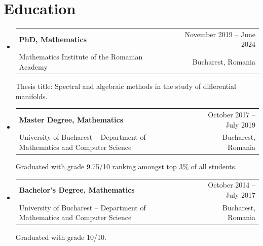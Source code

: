 \documentclass[a4paper, 11pt]{article}
\makeatletter
\newcommand{\CVSubheading}[4]{
  \vspace{-2pt}\item
    \begin{tabular*}{0.97\textwidth}[t]{l@{\extracolsep{\fill}}r}
      \textbf{#1} & #2 \\
      #3 & \ #4 \\
    \end{tabular*}\vspace{-7pt}
}
\newcommand{\CVSubHeadingListStart}{\begin{itemize}[leftmargin=0.5cm, label={}]}
\newcommand{\CVSubHeadingListEnd}{\end{itemize}}
\makeatother
\begin{document}
\section{Education}
  \CVSubHeadingListStart
    \CVSubheading
      {PhD, Mathematics}{November 2019 -- June 2024}
      {Mathematics Institute of the Romanian Academy}{Bucharest, Romania}

Thesis title: Spectral and algebraic methods in the study of differential manifolds.\\
    \CVSubheading
      {Master Degree, Mathematics}{October 2017 -- July 2019}
      {University of Bucharest -- Department of Mathematics and Computer Science}{Bucharest, Romania}
      
Graduated with grade 9.75/10 ranking amongst top 3\% of all students.
    \CVSubheading
      {Bachelor's Degree, Mathematics}{October 2014 -- July 2017}
      {University of Bucharest -- Department of Mathematics and Computer Science}{Bucharest, Romania}
      
Graduated with grade 10/10.
  \CVSubHeadingListEnd

\end{document}
